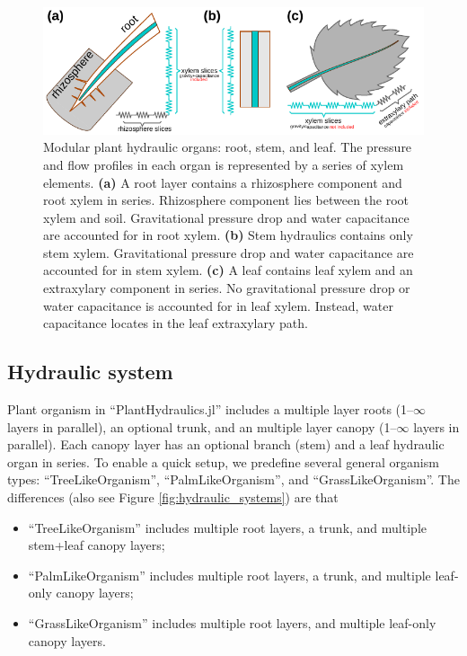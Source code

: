 \documentclass[twoside,10pt]{report}
\begin{document}
\begin{figure}[ht]
    \includegraphics[width=12cm]{YW_figures/hydraulic_organs}
    \caption{Modular plant hydraulic organs: root, stem, and leaf. The pressure and flow profiles in each organ is represented by a series of xylem elements. \textbf{(a)} A root layer contains a rhizosphere component and root xylem in series. Rhizosphere component lies between the root xylem and soil. Gravitational pressure drop and water capacitance are accounted for in root xylem. \textbf{(b)} Stem hydraulics contains only stem xylem. Gravitational pressure drop and water capacitance are accounted for in stem xylem. \textbf{(c)} A leaf contains leaf xylem and an extraxylary component in series. No gravitational pressure drop or water capacitance is accounted for in leaf xylem. Instead, water capacitance locates in the leaf extraxylary path.}
    \label{fig:hydraulic_organs}
\end{figure}




\subsection{Hydraulic system}
\par Plant organism in ``PlantHydraulics.jl'' includes a multiple layer roots (1--$\infty$ layers in parallel), an optional trunk, and an multiple layer canopy (1--$\infty$ layers in parallel). Each canopy layer has an optional branch (stem) and a leaf hydraulic organ in series. To enable a quick setup, we predefine several general organism types: ``TreeLikeOrganism'', ``PalmLikeOrganism'', and ``GrassLikeOrganism''. The differences (also see Figure \ref{fig:hydraulic_systems}) are that
\begin{itemize}
    \item ``TreeLikeOrganism'' includes multiple root layers, a trunk, and multiple stem+leaf canopy layers;
    \item ``PalmLikeOrganism'' includes multiple root layers, a trunk, and multiple leaf-only canopy layers;
    \item ``GrassLikeOrganism'' includes multiple root layers, and multiple leaf-only canopy layers.
\end{itemize}
\end{document}
